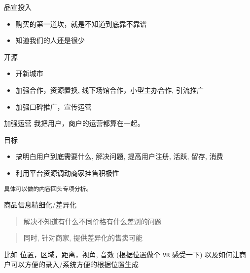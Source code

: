 \documentclass[presentation,bigger]{beamer}
\begin{document}
\begin{frame}[label={sec:orgec7ec44}]{品宣投入}
\begin{itemize}
\item 购买的第一道坎，就是不知道到底靠不靠谱
\item 知道我们的人还是很少
\end{itemize}
\end{frame}

\begin{frame}[label={sec:orgca03f38}]{开源}
\begin{itemize}
\item 开新城市
\item 加强合作，资源置换, 线下场馆合作，小型主办合作, 引流推广
\item 加强口碑推广，宣传运营
\end{itemize}
\end{frame}

\begin{frame}[fragile,label={sec:orge6b8580}]{加强运营}
 我把用户，商户的运营都算在一起。
\begin{block}{目标}
\begin{itemize}
\item 搞明白用户到底需要什么, 解决问题, 提高用户注册, 活跃, 留存, 消费
\item 利用平台资源调动商家挂售积极性
\end{itemize}

\texttt{具体可以做的内容回头专项分析。}
\end{block}
\end{frame}


\begin{frame}[fragile,label={sec:org26afb67}]{商品信息精细化/差异化}
 \begin{quote}
解决不知道有什么不同价格有什么差别的问题
\end{quote}
\begin{quote}
同时, 针对商家, 提供差异化的售卖可能
\end{quote}
比如 位置，区域，距离，视角, 音效 (根据位置做个 \texttt{VR} 感受一下)
以及如何让商户可以方便的录入/系统方便的根据位置生成
\end{frame}
\end{document}
